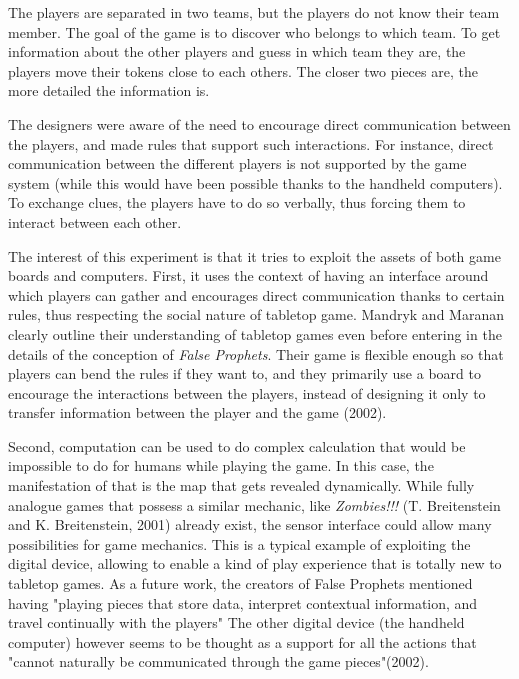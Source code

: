 The players are separated in two teams, but the players do not know their team member. The goal of the game is to discover who belongs to which team. To get information about the other players and guess in which team they are, the players move their tokens close to each others. The closer two pieces are, the more detailed the information is. 

The designers were aware of the need to encourage direct communication between the players, and made rules that support such interactions. For instance, direct communication between the different players is not supported by the game system (while this would have been possible thanks to the handheld computers). To exchange clues, the players have to do so verbally, thus forcing them to interact between each other. 

The interest of this experiment is that it tries to exploit the assets of both game boards and computers. First, it uses the context of having an interface around which players can gather and encourages direct communication thanks to certain rules, thus respecting the social nature of tabletop game. Mandryk and Maranan clearly outline their understanding of tabletop games even before entering in the details of the conception of \textit{False Prophets}. Their game is flexible enough so that players can bend the rules if they want to, and they primarily use a board to encourage the interactions between the players, instead of designing it only to transfer information between the player and the game (2002)\cite{art:prophets}.

Second, computation can be used to do complex calculation that would be impossible to do for humans while playing the game. In this case, the manifestation of that is the map that gets revealed dynamically.  While fully analogue games  that possess a similar mechanic, like \textit{Zombies!!!} (T. Breitenstein and K. Breitenstein, 2001)\cite{game:zombies} already exist, the sensor interface could allow many possibilities for game mechanics. This is a typical example of exploiting the digital device, allowing to enable a kind of play experience that is totally new to tabletop games. As a future work, the creators of False Prophets mentioned having "playing pieces that store data, interpret contextual information, and travel continually with the players" The other digital device (the handheld computer) however seems to be thought as a support for all the actions that "cannot naturally be communicated through the game pieces"(2002)\cite{art:prophets}.

